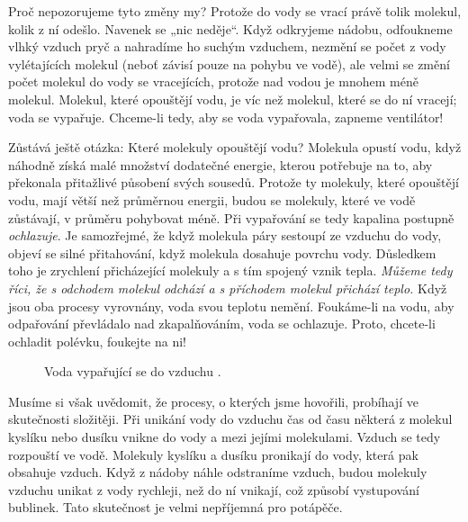       Proč nepozorujeme tyto změny my? Protože do vody se vrací právě tolik molekul, kolik z ní 
      odešlo. Navenek se „nic neděje“. Když odkryjeme nádobu, odfoukneme vlhký vzduch pryč a 
      nahradíme ho suchým vzduchem, nezmění se počet z vody vylétajících molekul (neboť závisí 
      pouze na pohybu ve vodě), ale velmi se změní počet molekul do vody se vracejících, protože 
      nad vodou je mnohem méně molekul. Molekul, které opouštějí vodu, je víc než molekul, které se 
      do ní vracejí; voda se vypařuje. Chceme-li tedy, aby se voda vypařovala, zapneme ventilátor!
      
      Zůstává ještě otázka: Které molekuly opouštějí vodu? Molekula opustí vodu, když náhodně získá 
      malé množství dodatečné energie, kterou potřebuje na to, aby překonala přitažlivé působení 
      svých sousedů. Protože ty molekuly, které opouštějí vodu, mají větší než průměrnou energii, 
      budou se molekuly, které ve vodě zůstávají, v průměru pohybovat méně. Při vypařování se tedy 
      kapalina postupně \emph{ochlazuje}. Je samozřejmé, že když molekula páry sestoupí ze vzduchu 
      do vody, objeví se silné přitahování, když molekula dosahuje povrchu vody. Důsledkem toho je 
      zrychlení přicházející molekuly a s tím spojený vznik tepla. \emph{Můžeme tedy říci, že s 
      odchodem molekul odchází a s příchodem molekul přichází teplo.} Když jsou oba procesy 
      vyrovnány, voda svou teplotu nemění. Foukáme-li na vodu, aby odpařování převládalo nad 
      zkapalňováním, voda se ochlazuje. Proto, chcete-li ochladit polévku, foukejte na ni!
      
      \begin{figure}[ht!]    %
        \centering
        \caption{Voda vypařující se do vzduchu \cite[s.~21]{Feynman01}.}
        \label{fyz:fig012}
      \end{figure}

      Musíme si však uvědomit, že procesy, o kterých jsme hovořili, probíhají ve skutečnosti 
      složitěji. Při unikání vody do vzduchu čas od času některá z molekul kyslíku nebo dusíku 
      vnikne do vody a  mezi jejími molekulami. Vzduch se tedy rozpouští ve vodě. 
      Molekuly kyslíku a dusíku pronikají do vody, která pak obsahuje vzduch. Když z nádoby náhle 
      odstraníme vzduch, budou molekuly vzduchu unikat z vody rychleji, než do ní vnikají, což 
      způsobí vystupování bublinek. Tato skutečnost je velmi nepříjemná pro potápěče.
    
